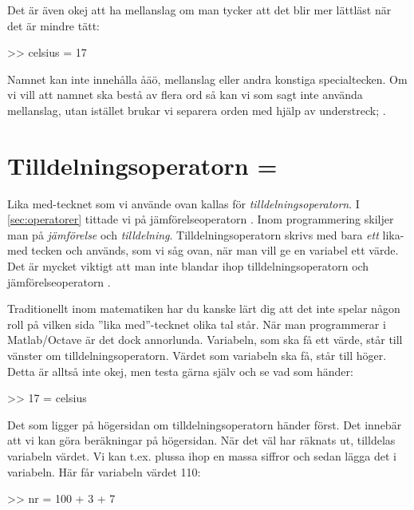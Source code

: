 Det är även okej att ha mellanslag om man tycker att det blir mer lättläst när det är mindre tätt:
\begin{matlab}[caption={Skapa variabeln celsius},label={}]
>> celsius = 17
\end{matlab}

Namnet kan inte innehålla åäö, mellanslag eller andra konstiga specialtecken. Om vi vill att namnet ska bestå av flera ord så kan vi som sagt inte använda mellanslag, utan istället brukar vi separera orden med hjälp av understreck; .


\section{Tilldelningsoperatorn =}\label{sec:tilldelningsoperatorn}
Lika med-tecknet \cw{=} som vi använde ovan kallas för \emph{tilldelningsoperatorn}. I \autoref{sec:operatorer} tittade vi på jämförelseoperatorn \cw{==}. Inom programmering skiljer man på \emph{jämförelse} och \emph{tilldelning}. Tilldelningsoperatorn skrivs med bara \emph{ett} lika-med tecken och används, som vi såg ovan, när man vill ge en variabel ett värde. Det är mycket viktigt att man inte blandar ihop tilldelningsoperatorn \cw{=} och jämförelseoperatorn \cw{==}.

Traditionellt inom matematiken har du kanske lärt dig att det inte spelar någon roll på vilken sida ''lika med''-tecknet olika tal står. När man programmerar i Matlab/Octave är det dock annorlunda. Variabeln, som ska få ett värde, står till vänster om tilldelningsoperatorn. Värdet som variabeln ska få, står till höger. Detta är alltså inte okej, men testa gärna själv och se vad som händer:

\begin{matlab}[caption={Man får inte sätta variabelnamnet på fel sida},label={}]
>> 17 = celsius %
\end{matlab}

Det som ligger på högersidan om tilldelningsoperatorn händer först. Det innebär att vi kan göra beräkningar på högersidan. När det väl har räknats ut, tilldelas variabeln värdet. Vi kan t.ex. plussa ihop en massa siffror och sedan lägga det i variabeln. Här får variabeln  värdet 110:

\begin{matlab}[caption={Beräkningar görs på högersidan om tilldelningsoperatorn},label={}]
>> nr = 100 + 3 + 7
\end{matlab}

